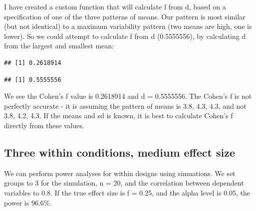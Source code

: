 \documentclass[]{book}
\newenvironment{Shaded}{\begin{snugshade}}{\end{snugshade}}
\newcommand{\DataTypeTok}[1]{\textcolor[rgb]{0.13,0.29,0.53}{#1}}
\newcommand{\KeywordTok}[1]{\textcolor[rgb]{0.13,0.29,0.53}{\textbf{#1}}}
\newcommand{\NormalTok}[1]{#1}
\newcommand{\OperatorTok}[1]{\textcolor[rgb]{0.81,0.36,0.00}{\textbf{#1}}}
\newcommand{\StringTok}[1]{\textcolor[rgb]{0.31,0.60,0.02}{#1}}
\begin{document}
I have created a custom function that will calculate f from d, based on a specification of one of the three patterns of means. Our pattern is most similar (but not identical) to a maximum variability pattern (two means are high, one is lower). So we could attempt to calculate f from d (0.5555556), by calculating d from the largest and smallest mean:

\begin{Shaded}
\end{Shaded}

\begin{verbatim}
## [1] 0.2618914
\end{verbatim}

\begin{Shaded}
\end{Shaded}

\begin{verbatim}
## [1] 0.5555556
\end{verbatim}

We see the Cohen's f value is 0.2618914 and d = 0.5555556. The Cohen's f is not perfectly accurate - it is assuming the pattern of means is 3.8, 4.3, 4.3, and not 3.8, 4.2, 4.3. If the means and sd is known, it is best to calculate Cohen's f directly from these values.

\hypertarget{three-within-conditions-medium-effect-size}{%
\subsection{Three within conditions, medium effect size}\label{three-within-conditions-medium-effect-size}}

We can perform power analyses for within designs using simuations. We set groups to 3 for the simulation, n = 20, and the correlation between dependent variables to 0.8. If the true effect size is f = 0.25, and the alpha level is 0.05, the power is 96.6\%.
\end{document}
